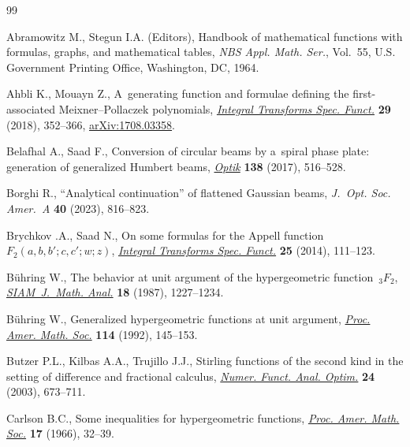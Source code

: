 \begin{thebibliography}{99}
\footnotesize\itemsep=0pt

Abramowitz M., Stegun I.A. (Editors), Handbook of mathematical functions with
 formulas, graphs, and mathematical tables, \textit{NBS Appl. Math. Ser.},
 Vol.~55, U.S. Government Printing Office, Washington, DC, 1964.

Ahbli K., Mouayn Z., A~generating function and formulae defining the
 first-associated {M}eixner--{P}ollaczek polynomials, \href{https://doi.org/10.1080/10652469.2018.1435647}{\textit{Integral
 Transforms Spec. Funct.}} \textbf{29} (2018), 352--366, \href{https://arxiv.org/abs/1708.03358}{arXiv:1708.03358}.

Belafhal A., Saad F., Conversion of circular beams by a~spiral phase plate:
 generation of generalized {H}umbert beams, \href{https://doi.org/10.1016/j.ijleo.2017.03.097}{\textit{Optik}} \textbf{138}
 (2017), 516--528.

Borghi R., ``Analytical continuation'' of flattened {G}aussian beams,
 \textit{J.~Opt. Soc. Amer.~A} \textbf{40} (2023), 816--823.

Brychkov {}.A., Saad N., On some formulas for the {A}ppell function
 {$F_2(a,b,b';c,c';w;z)$}, \href{https://doi.org/10.1080/10652469.2013.822207}{\textit{Integral Transforms Spec. Funct.}}
 \textbf{25} (2014), 111--123.

B\"uhring W., The behavior at unit argument of the hypergeometric
 function~{$_3F_2$}, \href{https://doi.org/10.1137/0518089}{\textit{SIAM~J.~Math. Anal.}} \textbf{18} (1987),
 1227--1234.

B\"uhring W., Generalized hypergeometric functions at unit argument,
 \href{https://doi.org/10.2307/2159793}{\textit{Proc. Amer. Math. Soc.}} \textbf{114} (1992), 145--153.

Butzer P.L., Kilbas A.A., Trujillo J.J., Stirling functions of the second kind
 in the setting of difference and fractional calculus, \href{https://doi.org/10.1081/NFA-120026366}{\textit{Numer. Funct.
 Anal. Optim.}} \textbf{24} (2003), 673--711.

Carlson B.C., Some inequalities for hypergeometric functions, \href{https://doi.org/10.2307/2035056}{\textit{Proc.
 Amer. Math. Soc.}} \textbf{17} (1966), 32--39.


\end{thebibliography}
